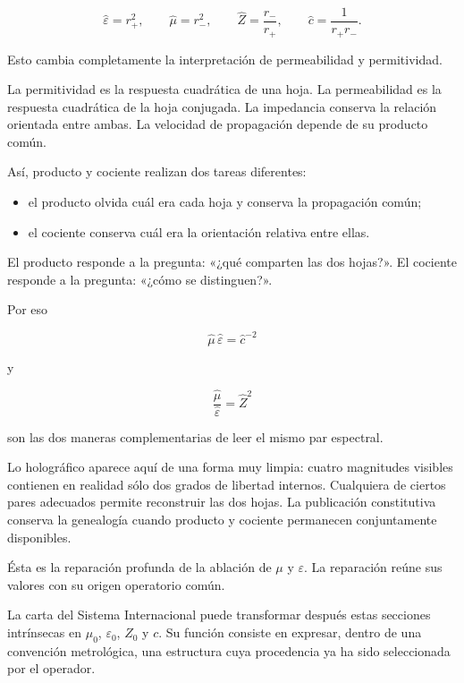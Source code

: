 \[
\widehat\varepsilon=r_+^2,
\qquad
\widehat\mu=r_-^2,
\qquad
\widehat Z=\frac{r_-}{r_+},
\qquad
\widehat c=\frac1{r_+r_-}.
\]

Esto cambia completamente la interpretación de permeabilidad y permitividad.\par

La permitividad es la respuesta cuadrática de una hoja. La permeabilidad es la respuesta cuadrática de la hoja conjugada. La impedancia conserva la relación orientada entre ambas. La velocidad de propagación depende de su producto común.\par

Así, producto y cociente realizan dos tareas diferentes:\par

\begin{itemize}[leftmargin=*,itemsep=0.35em]
\item el producto olvida cuál era cada hoja y conserva la propagación común;
\item el cociente conserva cuál era la orientación relativa entre ellas.
\end{itemize}

El producto responde a la pregunta: «¿qué comparten las dos hojas?». El cociente responde a la pregunta: «¿cómo se distinguen?».\par

Por eso\par

\[
\widehat\mu\,\widehat\varepsilon=\widehat c^{-2}
\]

y\par

\[
\frac{\widehat\mu}{\widehat\varepsilon}
=
\widehat Z^2
\]

son las dos maneras complementarias de leer el mismo par espectral.\par

Lo holográfico aparece aquí de una forma muy limpia: cuatro magnitudes visibles contienen en realidad sólo dos grados de libertad internos. Cualquiera de ciertos pares adecuados permite reconstruir las dos hojas. La publicación constitutiva conserva la genealogía cuando producto y cociente permanecen conjuntamente disponibles.\par

Ésta es la reparación profunda de la ablación de \(\mu\) y \(\varepsilon\). La reparación reúne sus valores con su origen operatorio común.\par

La carta del Sistema Internacional puede transformar después estas secciones intrínsecas en \(\mu_0\), \(\varepsilon_0\), \(Z_0\) y \(c\). Su función consiste en expresar, dentro de una convención metrológica, una estructura cuya procedencia ya ha sido seleccionada por el operador.\par


